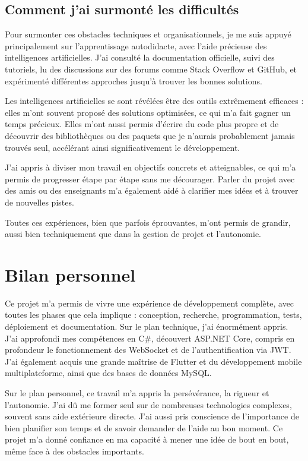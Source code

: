 \documentclass[12pt]{report}
\begin{document}
	\section{Comment j’ai surmonté les difficultés}
	
	Pour surmonter ces obstacles techniques et organisationnels, je me suis appuyé principalement sur l’apprentissage autodidacte, avec l’aide précieuse des intelligences artificielles. J’ai consulté la documentation officielle, suivi des tutoriels, lu des discussions sur des forums comme Stack Overflow et GitHub, et expérimenté différentes approches jusqu’à trouver les bonnes solutions.
	
	Les intelligences artificielles se sont révélées être des outils extrêmement efficaces : elles m’ont souvent proposé des solutions optimisées, ce qui m’a fait gagner un temps précieux. Elles m’ont aussi permis d’écrire du code plus propre et de découvrir des bibliothèques ou des paquets que je n’aurais probablement jamais trouvés seul, accélérant ainsi significativement le développement.
	
	J’ai appris à diviser mon travail en objectifs concrets et atteignables, ce qui m’a permis de progresser étape par étape sans me décourager. Parler du projet avec des amis ou des enseignants m’a également aidé à clarifier mes idées et à trouver de nouvelles pistes.
	
	Toutes ces expériences, bien que parfois éprouvantes, m’ont permis de grandir, aussi bien techniquement que dans la gestion de projet et l’autonomie.
	
	
	\chapter{Bilan personnel}
	
	Ce projet m’a permis de vivre une expérience de développement complète, avec toutes les phases que cela implique : conception, recherche, programmation, tests, déploiement et documentation. Sur le plan technique, j’ai énormément appris. J’ai approfondi mes compétences en C\#, découvert ASP.NET Core, compris en profondeur le fonctionnement des WebSocket et de l’authentification via JWT. J’ai également acquis une grande maîtrise de Flutter et du développement mobile multiplateforme, ainsi que des bases de données MySQL.
	
	Sur le plan personnel, ce travail m’a appris la persévérance, la rigueur et l’autonomie. J’ai dû me former seul sur de nombreuses technologies complexes, souvent sans aide extérieure directe. J’ai aussi pris conscience de l’importance de bien planifier son temps et de savoir demander de l’aide au bon moment. Ce projet m’a donné confiance en ma capacité à mener une idée de bout en bout, même face à des obstacles importants.
	
\end{document}
